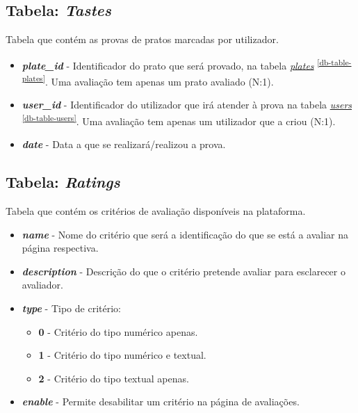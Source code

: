 \documentclass[11pt, a4paper, sans]{article}
\begin{document}
	\subsection{Tabela: \textit{Tastes}} \label{db-table-tastes}
	
	Tabela que contém as provas de pratos marcadas por utilizador.
	
	\begin{itemize}
		\item \textbf{\textit{plate\_id}} - Identificador do prato que será provado, na tabela 
			\underline{\textit{plates}} \textsuperscript{\ref{db-table-plates}}. 
			Uma avaliação tem apenas um prato avaliado (N:1).
		\item \textbf{\textit{user\_id}} - Identificador do utilizador que irá atender à prova na tabela 
			\underline{\textit{users}} \textsuperscript{\ref{db-table-users}}.
			Uma avaliação tem apenas um utilizador que a criou (N:1).	
		\item \textbf{\textit{date}} - Data a que se realizará/realizou a prova.		
	\end{itemize}

	\subsection{Tabela: \textit{Ratings}} \label{db-table-ratings}

	Tabela que contém os critérios de avaliação disponíveis na plataforma.

	\begin{itemize}
		\item \textbf{\textit{name}} - Nome do critério que será a identificação do que se está a avaliar
			na página respectiva.
		\item \textbf{\textit{description}} - Descrição do que o critério pretende avaliar para esclarecer
			o avaliador.
		\item \textbf{\textit{type}} - Tipo de critério:
			\begin{itemize}
				\item \textbf{0} - Critério do tipo numérico apenas.
				\item \textbf{1} - Critério do tipo numérico e textual.
				\item \textbf{2} - Critério do tipo textual apenas.
			\end{itemize}
		\item \textbf{\textit{enable}} - Permite desabilitar um critério na página de avaliações.
	\end{itemize}
\end{document}
